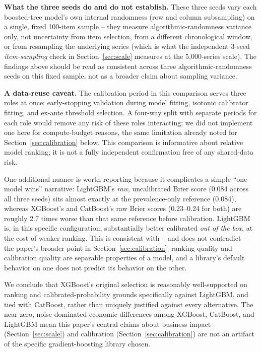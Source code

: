 \documentclass[11pt]{article}
\begin{document}
\textbf{What the three seeds do and do not establish.} These three seeds vary each boosted-tree model's own internal randomness (row and column subsampling) on a single, fixed 100-item sample -- they measure algorithmic-randomness variance only, not uncertainty from item selection, from a different chronological window, or from resampling the underlying series (which is what the independent 3-seed \emph{item-sampling} check in Section~\ref{sec:scale} measures at the 5{,}000-series scale). The findings above should be read as consistent across three algorithmic-randomness seeds on this fixed sample, not as a broader claim about sampling variance.

\textbf{A data-reuse caveat.} The calibration period in this comparison serves three roles at once: early-stopping validation during model fitting, isotonic calibrator fitting, and ex-ante threshold selection. A four-way split with separate periods for each role would remove any risk of these roles interacting; we did not implement one here for compute-budget reasons, the same limitation already noted for Section~\ref{sec:calibration} below. This comparison is informative about relative model ranking; it is not a fully independent confirmation free of any shared-data risk.

One additional nuance is worth reporting because it complicates a simple ``one model wins'' narrative: LightGBM's \emph{raw}, uncalibrated Brier score (0.084 across all three seeds) sits almost exactly at the prevalence-only reference (0.084), whereas XGBoost's and CatBoost's raw Brier scores (0.23--0.24 for both) are roughly 2.7 times worse than that same reference before calibration. LightGBM is, in this specific configuration, substantially better calibrated \emph{out of the box}, at the cost of weaker ranking. This is consistent with -- and does not contradict -- the paper's broader point in Section~\ref{sec:calibration}: ranking quality and calibration quality are separable properties of a model, and a library's default behavior on one does not predict its behavior on the other.

We conclude that XGBoost's original selection is reasonably well-supported on ranking and calibrated-probability grounds specifically against LightGBM, and tied with CatBoost, rather than uniquely justified against every alternative. The near-zero, noise-dominated economic differences among XGBoost, CatBoost, and LightGBM mean this paper's central claims about business impact (Section~\ref{sec:scale}) and calibration (Section~\ref{sec:calibration}) are not an artifact of the specific gradient-boosting library chosen.
\end{document}
